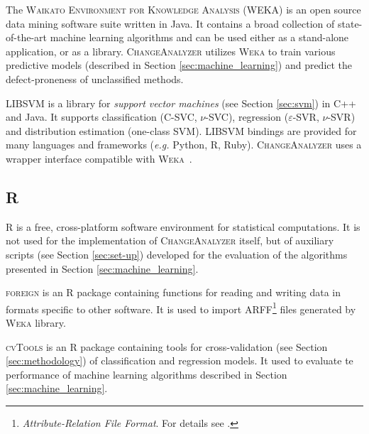 \documentclass{pracamgr}
\newcommand{\ca}{\textsc{ChangeAnalyzer}\xspace}
\newenvironment{definition}[1]%
	{
		\medskip
		\begin{adjustwidth}{\parindent}{}
		\rlap{\textbf{#1}}\par\nobreak
	}
	{
		\end{adjustwidth}
	}
\begin{document}
\begin{definition}{Weka}
The \textsc{Waikato Environment for Knowledge Analysis} (WEKA) \cite{weka} is an open source data mining software suite written in Java. It contains a broad collection of state-of-the-art machine learning algorithms and can be used either as a stand-alone application, or as a library. \ca utilizes \textsc{Weka} to train various predictive models (described in Section \ref{sec:machine_learning}) and predict the defect-proneness of unclassified methods.
\end{definition}

\begin{definition}{LIBSVM}
LIBSVM \cite{libsvm} is a library for \emph{support vector machines} (see Section \ref{sec:svm}) in C++ and Java. It supports classification (C-SVC, $\nu$-SVC), regression ($\varepsilon$-SVR, $\nu$-SVR) and distribution estimation (one-class SVM). LIBSVM bindings are provided for many languages and frameworks (\textit{e.g.} Python, R, Ruby). \ca uses a wrapper interface compatible with \textsc{Weka}~\cite{weka_libsvm}.
\end{definition}

\subsection{R}

R \cite{r} is a free, cross-platform software environment for statistical computations. It is not used for the implementation of \ca itself, but of auxiliary scripts (see Section \ref{sec:set-up}) developed for the evaluation of the algorithms presented in Section \ref{sec:machine_learning}.

\begin{definition}{foreign}
\textsc{foreign} \cite{foreign} is an R package containing functions for reading and writing data in formats specific to other software. It is used to import ARFF\footnote{\label{not:arff}\emph{Attribute-Relation File Format}. For details see \cite{arff}.} files generated by \textsc{Weka} library.
\end{definition}

\begin{definition}{cvTools}
\textsc{cvTools} \cite{cvTools} is an R package containing tools for cross-validation (see Section \ref{sec:methodology}) of classification and regression models. It used to evaluate te performance of machine learning algorithms described in Section \ref{sec:machine_learning}.
\end{definition}
\end{document}
